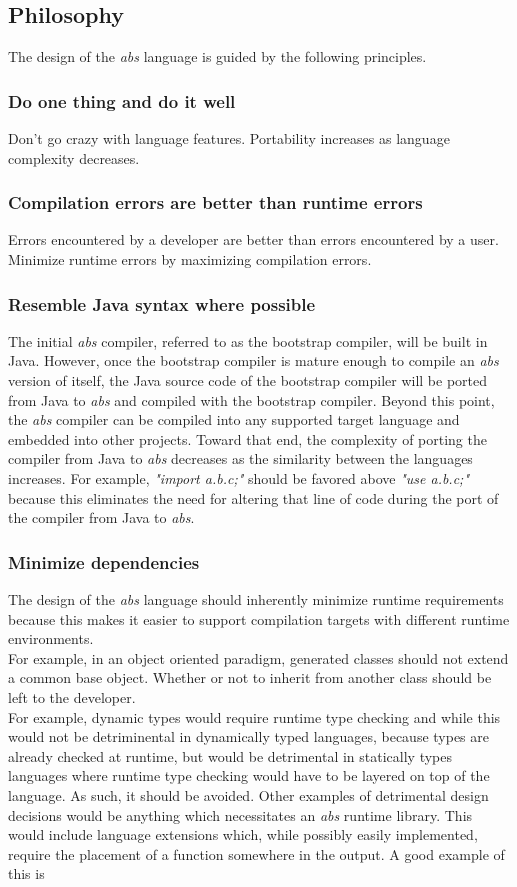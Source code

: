 \documentclass[hidelinks]{article}
\begin{document}
\subsection{Philosophy}
The design of the \textit{abs} language is guided by the following principles.
\subsubsection{Do one thing and do it well}
Don't go crazy with language features. Portability increases as language complexity decreases.
\subsubsection{Compilation errors are better than runtime errors}
Errors encountered by a developer are better than errors encountered by a user. Minimize runtime errors by maximizing compilation errors.
\subsubsection{Resemble Java syntax where possible}
The initial \textit{abs} compiler, referred to as the bootstrap compiler, will be built in Java. However, once the bootstrap compiler is mature enough to compile an \textit{abs} version of itself, the Java source code of the bootstrap compiler will be ported from Java to \textit{abs} and compiled with the bootstrap compiler. Beyond this point, the \textit{abs} compiler can be compiled into any supported target language and embedded into other projects. Toward that end, the complexity of porting the compiler from Java to \textit{abs} decreases as the similarity between the languages increases. For example, \textit{"import a.b.c;"} should be favored above \textit{"use a.b.c;"} because this eliminates the need for altering that line of code during the port of the compiler from Java to \textit{abs}.
\subsubsection{Minimize dependencies}
The design of the \textit{abs} language should inherently minimize runtime requirements because this makes it easier to support compilation targets with different runtime environments. 
\\
For example, in an object oriented paradigm, generated classes should not extend a common base object. Whether or not to inherit from another class should be left to the developer.
\\
For example, dynamic types would require runtime type checking and while this would not be detriminental in dynamically typed languages, because types are already checked at runtime, but would be detrimental in statically types languages where runtime type checking would have to be layered on top of the language. As such, it should be avoided. Other examples of detrimental design decisions would be anything which necessitates an \textit{abs} runtime library. This would include language extensions which, while possibly easily implemented, require the placement of a function somewhere in the output. A good example of this is 
\end{document}
